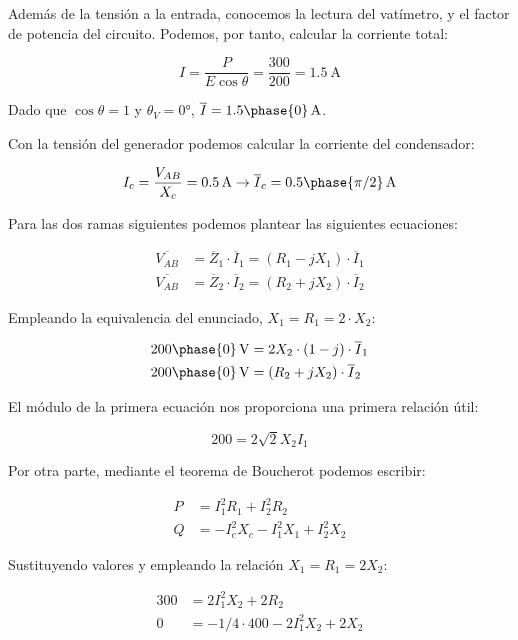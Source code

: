 \documentclass[12pt]{article}
\begin{document}
Además de la tensión a la entrada, conocemos la lectura del vatímetro, y el factor de potencia del circuito. Podemos, por tanto, calcular la corriente total:

\[
I = \frac{P}{E \cos\theta} = \frac{300}{200} = \SI{1.5}{\ampere}
\]

Dado que $\cos\theta = 1$ y $\theta_V = \ang{0}$, $\overline{I} =  \SI[parse-numbers=false]{1.5\phase{0}}{\ampere}$.

Con la tensión del generador podemos calcular la corriente del condensador:

\[
  I_c = \frac{V_{AB}}{X_c} = \SI{0.5}{\ampere} \rightarrow  \overline{I}_c = \SI[parse-numbers=false]{0.5\phase{\pi/2}}{\ampere}
\]

Para las dos ramas siguientes podemos plantear las siguientes ecuaciones:

\begin{align*}
  \overline{V_{AB}} &= \overline{Z}_1 \cdot \overline{I}_1 = (R_1 - jX_1) \cdot \overline{I}_1\\
  \overline{V_{AB}} &= \overline{Z}_2 \cdot \overline{I}_2 = (R_2 + jX_2) \cdot \overline{I}_2
\end{align*}

Empleando la equivalencia del enunciado, $X_1 = R_1 = 2 \cdot X_2$:

\begin{align*}
   \SI[parse-numbers=false]{200\phase{0}}{\volt} &=  2X_2\cdot (1 - j) \cdot \overline{I}_1\\
   \SI[parse-numbers=false]{200\phase{0}}{\volt} &= (R_2 + jX_2) \cdot \overline{I}_2
\end{align*}

El módulo de la primera ecuación nos proporciona una primera relación útil:

\[
 200 = 2\sqrt{2} X_2 I_1
\]

Por otra parte, mediante el teorema de Boucherot podemos escribir:

\begin{align*}
  P &= I_1^2 R_1 + I_2^2 R_2\\
  Q &= - I_c^2 X_c - I_1^2 X_1+ I_2^2X_2 
\end{align*}

Sustituyendo valores y empleando la relación $X_1 = R_1 = 2X_2$:

\begin{align*}
  300 &= 2I_1^2 X_2 + 2 R_2\\
  0 &= - 1/4 \cdot 400 - 2I_1^2X_2 + 2X_2 
\end{align*}
\end{document}
